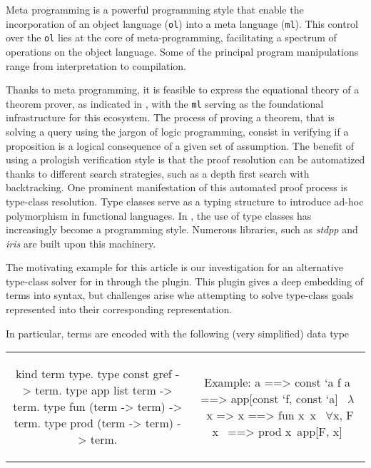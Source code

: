 \documentclass[acmengage]{acmart}
\def\elpi{\proglang{elpi}}
\def\coqelpi{\proglang{coq-elpi}}
\def\coq{\proglang{coq}}
\newcommand{\library}[1]{\textit{#1}\xspace}
\def\stdpp{\library{stdpp}}
\def\iris{\library{iris}}
\newcommand*{\acronym}[1]{\texttt{#1}\xspace}
\def\ol{\acronym{ol}} %
\def\ml{\acronym{ml}} %
\begin{document}
Meta programming is a powerful programming style that enable the incorporation
of an object language (\ol) into a meta language (\ml). This control over the
\ol lies at the core of meta-programming, facilitating a spectrum of operations
on the object language. Some of the principal program manipulations range
from interpretation to compilation.

Thanks to meta programming, it is feasible to express the equational theory of a
theorem prover, as indicated in \cite{X, Y, Z}, with the \ml serving as the
foundational infrastructure for this ecosystem. The process of proving a theorem, that is
solving a query using the jargon of logic programming, consist in verifying if a
proposition is a logical consequence of a given set of assumption. The benefit
of using a prologish verification style is that the proof resolution can be
automatized thanks to different search strategies, such as a depth first search
with backtracking. One prominent manifestation of this automated proof process is
type-class resolution\cite{wadler89, sozeau08}. Type classes serve as a typing
structure to introduce ad-hoc polymorphism in functional languages.
In \coq, the use of type classes has increasingly become a programming
style. Numerous libraries, such as \stdpp and
\iris are built upon this machinery.

The motivating example for this article is our investigation for an alternative
type-class solver for \coq in \elpi{} through the \coqelpi
plugin. This plugin gives a deep embedding of \coq terms into \elpi syntax, but
challenges arise whe attempting to solve type-class goals represented into their
corresponding \elpi representation.

In particular, \coq terms are encoded with the following (very simplified)
data type 


\noindent %
\begin{tabular}{c|c}
  \begin{minipage}[c]{0.50\linewidth}
    \begin{elpicode}
      kind term type.
      type const gref -> term.
      type app list term -> term.
      type fun (term -> term) -> term.
      type prod (term -> term) -> term.
    \end{elpicode}
  \end{minipage}
  &
  \begin{minipage}[c]{0.48\linewidth}
    \begin{textcode}
      Example:
      a       ==> const `a
      f a     ==> app[const `f, const `a]
      ~$\lambda$~x => x ==> fun x\ x
      ~$\forall$x, F x~ ==> prod x\ app[F, x]
    \end{textcode}
  \end{minipage}
\end{tabular}
 
\end{document}
